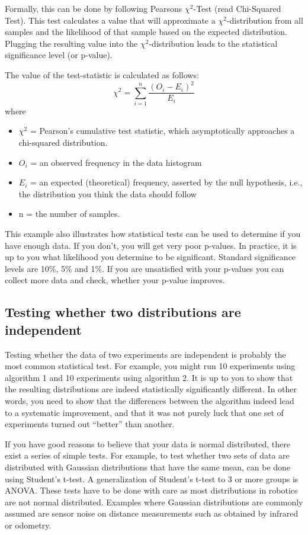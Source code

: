 Formally, this can be done by following Pearsons $ \chi^2$-Test (read Chi-Squared Test). This test calculates a value that will approximate a $ \chi^2$-distribution from all samples and the likelihood of that sample based on the expected distribution. Plugging the resulting value into the $ \chi^2$-distribution leads to the statistical significance level (or p-value).

The value of the test-statistic is calculated as follows:
\begin{equation}
\chi^2 = \sum_{i=1}^{n} \frac{(O_i - E_i)^2}{E_i}
\end{equation}
where
\begin{itemize}
\item $ \chi^2$ = Pearson's cumulative test statistic, which asymptotically approaches a chi-squared distribution.
\item $ O_i$ = an observed frequency in the data histogram
\item $ E_i$ = an expected (theoretical) frequency, asserted by the null hypothesis, i.e., the distribution you think the data should follow
\item n = the number of samples.
\end{itemize}
This example also illustrates how statistical tests can be used to determine if you have enough data. If you don't, you will get very poor p-values.  In practice, it is up to you what likelihood you determine to be significant. Standard significance levels are 10\%, 5\% and 1\%. If you are unsatisfied with your p-values you can collect more data and check, whether your p-value improves.

\subsection{Testing whether two distributions are independent}
Testing whether the data of two experiments are independent is probably the most common statistical test. For example, you might run 10 experiments using algorithm 1 and 10 experiments using algorithm 2. It is up to you to show that the resulting distributions are indeed statistically significantly different. In other words, you need to show that the differences between the algorithm indeed lead to a systematic improvement, and that it was not purely luck that one set of experiments turned out ``better'' than another.

If you have good reasons to believe that your data is normal distributed, there exist a series of simple tests. For example, to test whether two sets of data are distributed with Gaussian distributions that have the same mean, can be done using Student's t-test. A generalization of Student's t-test to 3 or more groups is ANOVA. These tests have to be done with care as most distributions in robotics are not normal distributed. Examples where  Gaussian distributions are commonly assumed are sensor noise on distance measurements such as obtained by infrared or odometry.

